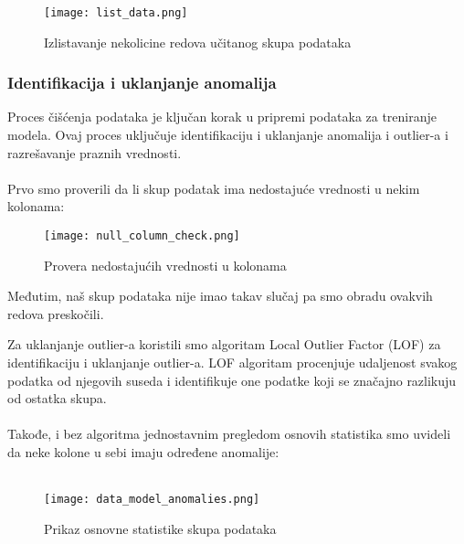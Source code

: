 \documentclass[a4paper,12pt]{article}
\begin{document}
\begin{figure}[h!]
\centering
\texttt{[image: list\_data.png]}
\caption{Izlistavanje nekolicine redova učitanog skupa podataka}
\label{fig:sql_query}
\end{figure}

\clearpage

\subsubsection{Identifikacija i uklanjanje anomalija}
Proces čišćenja podataka je ključan korak u pripremi podataka za treniranje modela. Ovaj proces uključuje identifikaciju i uklanjanje anomalija i outlier-a i razrešavanje praznih vrednosti.\\\\
Prvo smo proverili da li skup podatak ima nedostajuće vrednosti u nekim kolonama:

\begin{figure}[h!]
\centering
\texttt{[image: null\_column\_check.png]}
\caption{Provera nedostajućih vrednosti u kolonama}
\label{fig:sql_query}
\end{figure}

Međutim, naš skup podataka nije imao takav slučaj pa smo obradu ovakvih redova preskočili.

\clearpage
Za uklanjanje outlier-a koristili smo algoritam Local Outlier Factor (LOF) za identifikaciju i uklanjanje outlier-a. LOF algoritam procenjuje udaljenost svakog podatka od njegovih suseda i identifikuje one podatke koji se značajno razlikuju od ostatka skupa.\\\\
Takođe, i bez algoritma jednostavnim pregledom osnovih statistika smo uvideli da neke kolone u sebi imaju određene anomalije:\\\\

\begin{figure}[h!]
\centering
\texttt{[image: data\_model\_anomalies.png]}
\caption{Prikaz osnovne statistike skupa podataka}
\label{fig:sql_query}
\end{figure}
\end{document}
